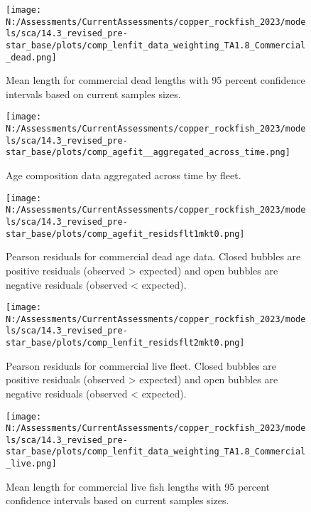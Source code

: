 \documentclass[11pt,
  english,
  letterpaper,
]{article}
\begin{document}
\pagebreak

\begin{figure}
\centering
\texttt{[image: N:/Assessments/CurrentAssessments/copper\_rockfish\_2023/models/sca/14.3\_revised\_pre-star\_base/plots/comp\_lenfit\_data\_weighting\_TA1.8\_Commercial\_dead.png]}
\caption{Mean length for commercial dead lengths with 95 percent confidence intervals based on current samples sizes.\label{fig:com-dead-mean-len-fit}}
\end{figure}

\pagebreak

\begin{figure}
\centering
\texttt{[image: N:/Assessments/CurrentAssessments/copper\_rockfish\_2023/models/sca/14.3\_revised\_pre-star\_base/plots/comp\_agefit\_\_aggregated\_across\_time.png]}
\caption{Age composition data aggregated across time by fleet.\label{fig:agg-marg-age-fit}}
\end{figure}

\pagebreak

\begin{figure}
\centering
\texttt{[image: N:/Assessments/CurrentAssessments/copper\_rockfish\_2023/models/sca/14.3\_revised\_pre-star\_base/plots/comp\_agefit\_residsflt1mkt0.png]}
\caption{Pearson residuals for commercial dead age data. Closed bubbles are positive residuals (observed \textgreater{} expected) and open bubbles are negative residuals (observed \textless{} expected).\label{fig:com-dead-age-pearson}}
\end{figure}

\pagebreak

\begin{figure}
\centering
\texttt{[image: N:/Assessments/CurrentAssessments/copper\_rockfish\_2023/models/sca/14.3\_revised\_pre-star\_base/plots/comp\_lenfit\_residsflt2mkt0.png]}
\caption{Pearson residuals for commercial live fleet. Closed bubbles are positive residuals (observed \textgreater{} expected) and open bubbles are negative residuals (observed \textless{} expected).\label{fig:com-live-pearson}}
\end{figure}

\pagebreak

\begin{figure}
\centering
\texttt{[image: N:/Assessments/CurrentAssessments/copper\_rockfish\_2023/models/sca/14.3\_revised\_pre-star\_base/plots/comp\_lenfit\_data\_weighting\_TA1.8\_Commercial\_live.png]}
\caption{Mean length for commercial live fish lengths with 95 percent confidence intervals based on current samples sizes.\label{fig:com-live-mean-len-fit}}
\end{figure}
\end{document}
